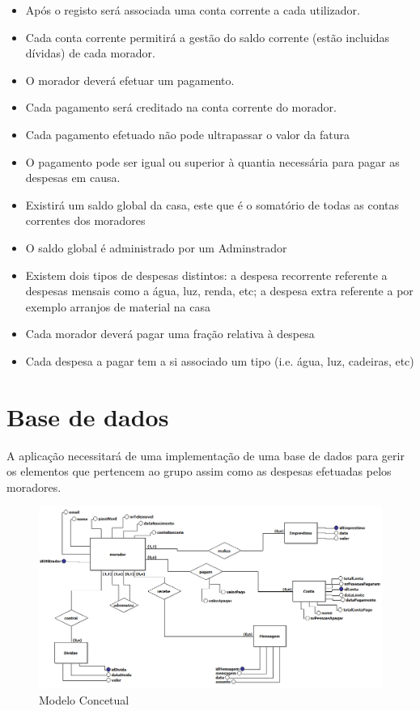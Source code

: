 \begin{itemize}
	
\item{Após o registo será associada uma conta corrente a cada utilizador.}

\item{Cada conta corrente permitirá a gestão do saldo corrente (estão incluidas dívidas) de cada morador.}

\item{O morador deverá efetuar um pagamento.}
 
\item{Cada pagamento será creditado na conta corrente do morador.}

\item{Cada pagamento efetuado não pode ultrapassar o valor da fatura}
 
 \item{O pagamento pode ser igual ou superior à quantia necessária para pagar as despesas em causa.}
 
 
\item{Existirá um saldo global da casa, este que é o somatório de todas as contas correntes dos moradores}
 
 \item{O saldo global é administrado por um Adminstrador}
 
\item{Existem dois tipos de despesas distintos: a despesa recorrente referente a despesas mensais como a água, luz, renda, etc; a despesa extra referente a por exemplo arranjos de material na casa}
 
\item{Cada morador deverá pagar uma fração relativa à despesa}
 
\item{Cada despesa a pagar tem a si associado um tipo (i.e. água, luz, cadeiras, etc)}

\end{itemize}


\section{Base de dados }
A aplicação necessitará de uma implementação de uma base de dados para gerir os elementos que pertencem ao grupo assim como as despesas efetuadas pelos moradores. 


\begin{figure}[htb!]
	\includegraphics[scale=0.6]{imagens/bd/modeloconcetual}  
	\caption{Modelo Concetual}  
\end{figure}

